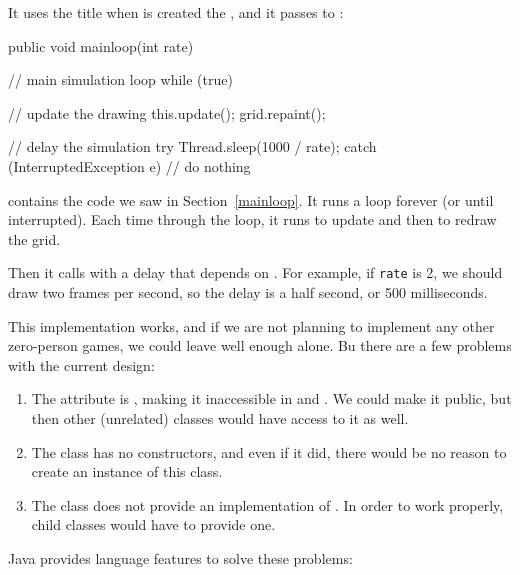 It uses the title when is created the , and it passes  to :

\begin{code}
public void mainloop(int rate) {
    // main simulation loop
    while (true) {

        // update the drawing
        this.update();
        grid.repaint();

        // delay the simulation
        try {
            Thread.sleep(1000 / rate);
        } catch (InterruptedException e) {
            // do nothing
        }
    }
}
\end{code}

 contains the code we saw in Section~\ref{mainloop}.
It runs a  loop forever (or until interrupted).
Each time through the loop, it runs  to update  and then  to redraw the grid.

Then it calls  with a delay that depends on .
For example, if {\tt rate} is 2, we should draw two frames per second, so the delay is a half second, or 500 milliseconds.

This implementation works, and if we are not planning to implement any other zero-person games, we could leave well enough alone.
Bu there are a few problems with the current design:

\begin{enumerate}

\item The  attribute is , making it inaccessible in  and .
We could make it public, but then other (unrelated) classes would have access to it as well.

\item The  class has no constructors, and even if it did, there would be no reason to create an instance of this class.

\item The  class does not provide an implementation of .
In order to work properly, child classes would have to provide one.

\end{enumerate}


Java provides language features to solve these problems:

